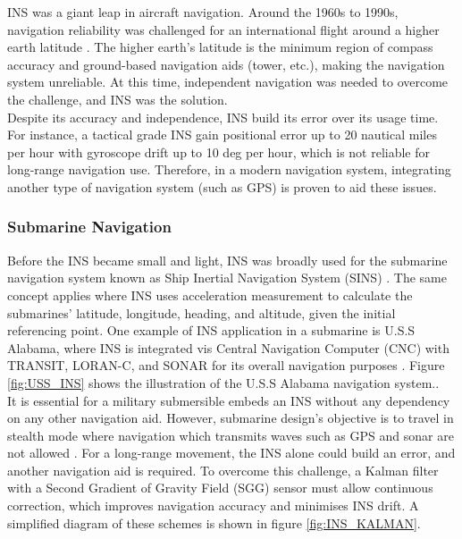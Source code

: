 \begin{figure}[!ht]
\begin{minipage}{.6\textwidth}
  \label{fig:InterfaceINS}
\end{minipage}
\end{figure}

\vspace{5mm}
\noindent INS was a giant leap in aircraft navigation. Around the 1960s to 1990s, navigation reliability was challenged for an international flight around a higher earth latitude \cite{Anonymous1964InertialNavigation}. The higher earth's latitude is the minimum region of compass accuracy and ground-based navigation aids (tower, etc.), making the navigation system unreliable. At this time, independent navigation was needed to overcome the challenge, and INS was the solution.\\

\noindent Despite its accuracy and independence, INS build its error over its usage time. For instance, a tactical grade INS gain positional error up to 20 nautical miles per hour with gyroscope drift up to 10 deg per hour, which is not reliable for long-range navigation use. Therefore, in a modern navigation system, integrating another type of navigation system (such as GPS) is proven to aid these issues.\\

\subsubsection{Submarine Navigation}

Before the INS became small and light, INS was broadly used for the submarine navigation system known as Ship Inertial Navigation System (SINS) \cite{NATOSINS}. The same concept applies where INS uses acceleration measurement to calculate the submarines' latitude, longitude, heading, and altitude, given the initial referencing point.  One example of INS application in a submarine is U.S.S Alabama, where INS is integrated vis Central Navigation Computer (CNC) with TRANSIT, LORAN-C, and SONAR for its overall navigation purposes \cite{HowNavigation}. Figure \ref{fig:USS_INS} shows the illustration of the U.S.S Alabama navigation system..\\

\noindent It is essential for a military submersible embeds an INS without any dependency on any other navigation aid. However, submarine design's objective is to travel in stealth mode where navigation which transmits waves such as GPS and sonar are not allowed \cite{Rogobete2018UsingPositioning}. For a long-range movement, the INS alone could build an error, and another navigation aid is required. To overcome this challenge, a Kalman filter with a Second Gradient of Gravity Field (SGG) sensor must allow continuous correction, which improves navigation accuracy and minimises INS drift. A simplified diagram of these schemes is shown in figure \ref{fig:INS_KALMAN}.\\

